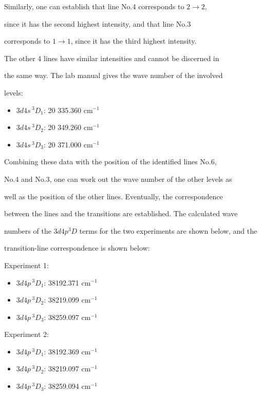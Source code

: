 \documentclass[a4paper]{article}
\begin{document}
Similarly, one can establish that line No.4 corresponds to $2 \to 2$,

since it has the second highest intensity, and that line No.3

corresponds to $1 \to 1$, since it has the third highest intensity.

The other 4 lines have similar intensities and cannot be discerned in

the same way. The lab manual gives the wave number of the involved

levels:

\begin{itemize}

\item $3d4s\,^3D_1$: 20 335.360 cm$^{-1}$

\item $3d4s\,^3D_2$: 20 349.260 cm$^{-1}$

\item $3d4s\,^3D_3$: 20 371.000 cm$^{-1}$

\end{itemize}

Combining these data with the position of the identified lines No.6,

No.4 and No.3, one can work out the wave number of the other levels as

well as the position of the other lines. Eventually, the correspondence

between the lines and the transitions are established. The calculated wave

numbers of the $3d4p ^3D$ terms for the two experiments are shown below, and the

transition-line correspondence is shown below:

Experiment 1:

\begin{itemize}

\item $3d4p\,^3D_1$: 38192.371 cm$^{-1}$

\item $3d4p\,^3D_2$: 38219.099 cm$^{-1}$

\item $3d4p\,^3D_3$: 38259.097 cm$^{-1}$

\end{itemize}

Experiment 2:

\begin{itemize}

\item $3d4p\,^3D_1$: 38192.369 cm$^{-1}$

\item $3d4p\,^3D_2$: 38219.097 cm$^{-1}$

\item $3d4p\,^3D_3$: 38259.094 cm$^{-1}$

\end{itemize}
\end{document}
